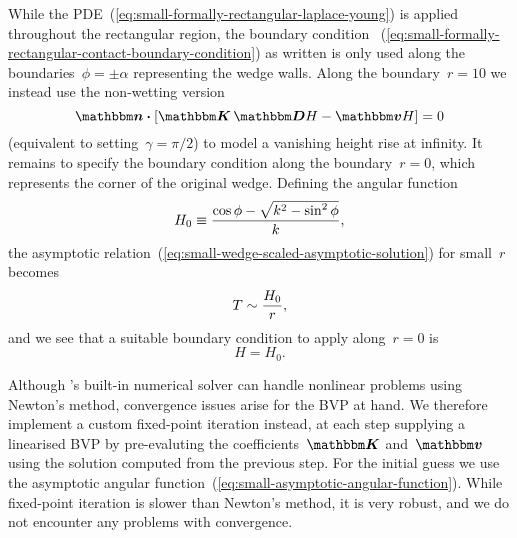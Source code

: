 While the PDE~(\ref{eq:small-formally-rectangular-laplace-young})
is applied throughout the rectangular region,
the boundary condition~%
  (\ref{eq:small-formally-rectangular-contact-boundary-condition})
as written
is only used along the boundaries~$\phi = \pm\alpha$
representing the wedge walls.
Along the boundary~$r = 10$ we instead use the non-wetting version
\begin{equation}
  \mat{n} \dotp \squarebr[\bulkysize]{\mat{K} \matder H - \mat{v} H} = 0
  \label{eq:small-formally-rectangular-natural-boundary-condition}
\end{equation}
(equivalent to setting~$\gamma = \pi/2$)
to model a vanishing height rise at infinity.
It remains to specify the boundary condition along the boundary~$r = 0$,
which represents the corner of the original wedge.
Defining the angular function
\begin{equation}
  H_0 \equiv \frac{\cos\phi - \sqrt{k^2 - \sin^2 \phi}}{k},
  \label{eq:small-asymptotic-angular-function}
\end{equation}
the asymptotic relation~(\ref{eq:small-wedge-scaled-asymptotic-solution})
for small~$r$ becomes
\begin{equation}
  T \sim \frac{H_0}{r},
  \label{eq:small-asymptotic-solution}
\end{equation}
and we see that a suitable boundary condition to apply along~$r = 0$ is
\begin{equation}
  H = H_0.
\end{equation}

Although 's built-in numerical solver
can handle nonlinear problems using Newton's method,
convergence issues arise for the BVP at hand.
We therefore implement a custom fixed-point iteration instead,
at each step supplying a linearised BVP
by pre-evaluting the coefficients~$\mat{K}$ and~$\mat{v}$
using the solution computed from the previous step.
For the initial guess we use
the asymptotic angular function~(\ref{eq:small-asymptotic-angular-function}).
While fixed-point iteration is slower than Newton's method,
it is very robust, and we do not encounter any problems with convergence.
